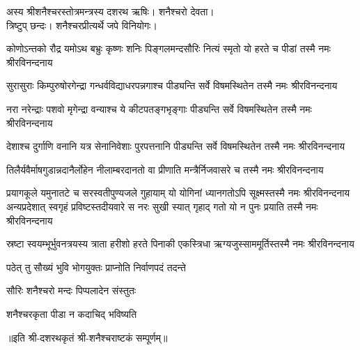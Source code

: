 

अस्य श्रीशनैश्चरस्तोत्रमन्त्रस्य दशरथ ऋषिः। शनैश्चरो देवता।\\
त्रिष्टुप् छन्दः। शनैश्चरप्रीत्यर्थे जपे विनियोगः।


\twolineshloka
{कोणोऽन्तको रौद्र यमोऽथ बभ्रुः कृष्णः शनिः पिङ्गलमन्दसौरिः}
{नित्यं स्मृतो यो हरते च पीडां तस्मै नमः श्रीरविनन्दनाय}

\twolineshloka
{सुरासुराः किम्पुरुषोरगेन्द्रा गन्धर्वविद्याधरपन्नगाश्च}
{पीड्यन्ति सर्वे विषमस्थितेन तस्मै नमः श्रीरविनन्दनाय}

\twolineshloka
{नरा नरेन्द्राः पशवो मृगेन्द्रा वन्याश्च ये कीटपतङ्गभृङ्गाः}
{पीड्यन्ति सर्वे विषमस्थितेन तस्मै नमः श्रीरविनन्दनाय}

\twolineshloka
{देशाश्च दुर्गाणि वनानि यत्र सेनानिवेशाः पुरपत्तनानि}
{पीड्यन्ति सर्वे विषमस्थितेन तस्मै नमः श्रीरविनन्दनाय}

\twolineshloka
{तिलैर्यवैर्माषगुडान्नदानैर्लोहेन नीलाम्बरदानतो वा}
{प्रीणाति मन्त्रैर्निजवासरे च तस्मै नमः श्रीरविनन्दनाय}

\twolineshloka
{प्रयागकूले यमुनातटे च सरस्वतीपुण्यजले गुहायाम्}
{यो योगिनां ध्यानगतोऽपि सूक्ष्मस्तस्मै नमः श्रीरविनन्दनाय}
\twolineshloka
{अन्यप्रदेशात् स्वगृहं प्रविष्टस्तदीयवारे स नरः सुखी स्यात्}
{गृहाद् गतो यो न पुनः प्रयाति तस्मै नमः श्रीरविनन्दनाय}

\twolineshloka
{स्रष्टा स्वयम्भूर्भुवनत्रयस्य त्राता हरीशो हरते पिनाकी}
{एकस्त्रिधा ऋग्यजुस्साममूर्तिस्तस्मै नमः श्रीरविनन्दनाय}

{पठेत् तु सौख्यं भुवि भोगयुक्तः प्राप्नोति निर्वाणपदं तदन्ते}

{सौरिः शनैश्चरो मन्दः पिप्पलादेन संस्तुतः}

{शनैश्चरकृता पीडा न कदाचिद् भविष्यति}

॥इति श्री-दशरथकृतं श्री-शनैश्चराष्टकं सम्पूर्णम्॥

